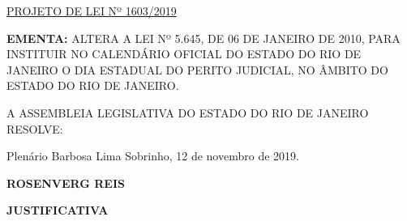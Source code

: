 \documentclass[10pt]{article}
\date{}
\begin{document}
\maketitle
\begin{center}
  \huge
  \vspace{-3cm}\href{http://alerjln1.alerj.rj.gov.br/scpro1923.nsf/f4b46b3cdbba990083256cc900746cf6/d5e437fdb820d951832584b00043bed3?OpenDocument}{PROJETO DE LEI Nº 1603/2019}
\bigskip
\bigskip
\bigskip
  
\end{center}

\textbf{EMENTA:} 
ALTERA A LEI Nº 5.645, DE 06 DE JANEIRO DE 2010, PARA INSTITUIR NO CALENDÁRIO OFICIAL DO ESTADO DO RIO DE JANEIRO O DIA ESTADUAL DO PERITO JUDICIAL, NO ÂMBITO DO ESTADO DO RIO DE JANEIRO.  








\bigskip

\noindent
A ASSEMBLEIA LEGISLATIVA DO ESTADO DO RIO DE JANEIRO RESOLVE:





\begin{center}
  Plenário Barbosa Lima Sobrinho, 12 de novembro de 2019.

   \bigskip

  \textbf{ ROSENVERG REIS}

  \bigskip

  \textbf{JUSTIFICATIVA}
  \bigskip

\end{center}
\end{document}
